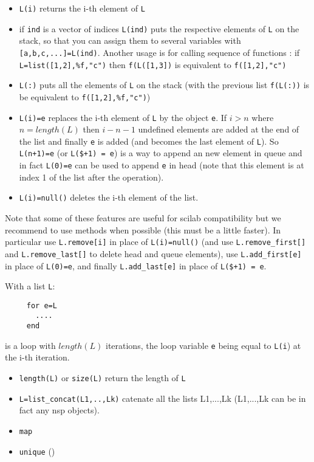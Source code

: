 \begin{itemize}
   \item \verb+L(i)+ returns the i-th element of \verb+L+
   \item if \verb+ind+ is a vector of indices \verb+L(ind)+ 
         puts the respective elements of \verb+L+ on the
         stack, so that you can assign them to several variables
         with \verb+[a,b,c,...]=L(ind)+. Another usage is for
         calling sequence of functions : if \verb+L=list([1,2],%f,"c")+
         then  \verb+f(L([1,3])+ is equivalent to  \verb+f([1,2],"c")+
   \item \verb+L(:)+ puts all the elements of \verb+L+ on the stack
   (with the previous list  \verb+f(L(:))+ is be equivalent to \verb+f([1,2],%f,"c")+)
   \item \verb+L(i)=e+ replaces the i-th element of \verb+L+ by
   the object \verb+e+. If $i > n$ where $n=length(L)$ then $i-n-1$ undefined
   elements are added at the end of the list and finally \verb+e+
   is added (and becomes the last element of \verb+L+). 
   So \verb-L(n+1)=e- (or \verb-L($+1) = e-) is a way to append an new element 
   in queue  and in fact \verb+L(0)=e+ can be used to append \verb+e+ 
   in head (note that this element is at index 1 of the list after the operation).
   \item \verb+L(i)=null()+ deletes the i-th element of the list.
\end{itemize}

Note that some of these features are useful for scilab compatibility
but we recommend to use methods when possible (this must be a little
faster). In particular use \verb+L.remove[i]+ in place of
\verb+L(i)=null()+ (and use \verb+L.remove_first[]+ and
\verb+L.remove_last[]+ to delete head and queue elements),
 use \verb+L.add_first[e]+ in place of
\verb+L(0)=e+, and finally \verb+L.add_last[e]+ in place of \verb-L($+1) = e-.


With a list \verb+L+:\begin{verbatim}
     for e=L
       ....
     end
\end{verbatim} 
is a loop with $length(L)$ iterations, the loop 
variable  \verb+e+ being equal to \verb+L(i+) at the i-th iteration.

\begin{itemize}
   \item \verb+length(L)+ or \verb+size(L)+ return the length of \verb+L+
   \item \verb+L=list_concat(L1,..,Lk)+ catenate all the lists
         L1,...,Lk (L1,...,Lk can be in fact any nsp objects).
   \item \verb+map+
   \item \verb+unique+ () 
\end{itemize}


